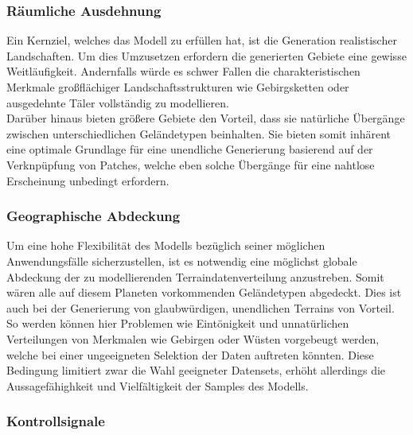 \subsubsection {Räumliche Ausdehnung}

Ein Kernziel, welches das Modell zu erfüllen hat, ist die Generation realistischer Landschaften. Um dies Umzusetzen erfordern die generierten Gebiete eine gewisse Weitläufigkeit. Andernfalls würde es schwer Fallen die charakteristischen Merkmale großflächiger Landschaftsstrukturen wie Gebirgsketten oder ausgedehnte Täler vollständig zu modellieren. \\
Darüber hinaus bieten größere Gebiete den Vorteil, dass sie natürliche Übergänge zwischen unterschiedlichen Geländetypen beinhalten. Sie bieten somit inhärent eine optimale Grundlage für eine unendliche Generierung basierend auf der Verknpüpfung von Patches, welche eben solche Übergänge für eine nahtlose Erscheinung unbedingt erfordern.  

\subsubsection {Geographische Abdeckung}
\label{subsubsec:Geographische_Abdeckung}

Um eine hohe Flexibilität des Modells bezüglich seiner möglichen Anwendungsfälle sicherzustellen, ist es notwendig eine möglichst globale Abdeckung der zu modellierenden Terraindatenverteilung anzustreben. Somit wären alle auf diesem Planeten vorkommenden Geländetypen abgedeckt. Dies ist auch bei der Generierung von glaubwürdigen, unendlichen Terrains von Vorteil. So werden können hier Problemen wie Eintönigkeit und unnatürlichen Verteilungen von Merkmalen wie Gebirgen oder Wüsten vorgebeugt werden, welche bei einer ungeeigneten Selektion der Daten auftreten könnten. Diese Bedingung limitiert zwar die Wahl geeigneter Datensets, erhöht allerdings die Aussagefähighkeit und Vielfältigkeit der Samples des Modells.  

\subsubsection {Kontrollsignale}

